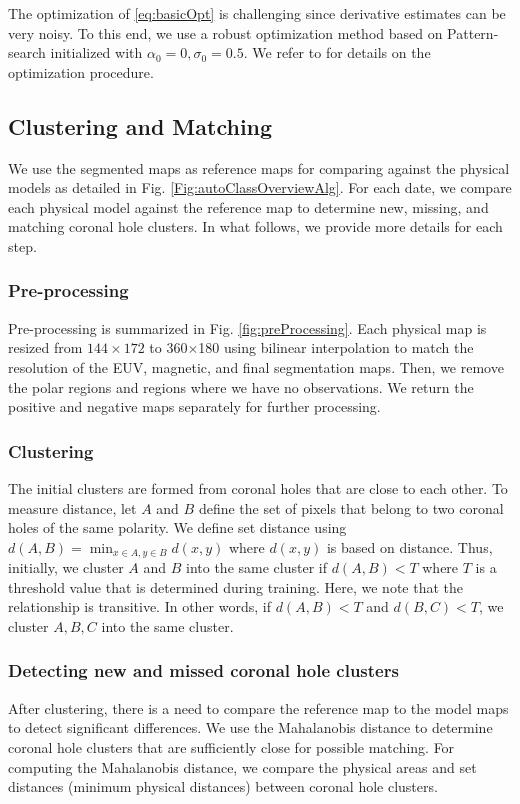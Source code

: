 \documentclass[journal]{IEEEtran}
\begin{document}
The optimization of \eqref{eq:basicOpt} is challenging since
derivative estimates can be very noisy.
To this end, we use a robust optimization method
based on Pattern-search initialized with $\alpha_0=0, \sigma_0=0.5$.
We refer to \cite{optbook} for details on the optimization procedure.       
\color{black}



\subsection{Clustering and Matching}\label{sec:ClusteringAndMatching}
We use the segmented maps as reference maps for comparing
   against the physical models as detailed in Fig. \ref{Fig:autoClassOverviewAlg}.
For each date, we compare each physical model against the reference
   map to determine new, missing, and matching coronal hole clusters. 
In what follows, we provide more details for each step. 
\subsubsection{Pre-processing}\label{sec:ch4preprocessing}
Pre-processing is summarized in Fig. \ref{fig:preProcessing}.
\color{blue} 
Each physical map is resized from $144\times 172$ to 360$\times$180 using bilinear interpolation
 to match the resolution of the EUV, magnetic, and final segmentation maps.
\color{black} 
Then, we remove the polar regions and regions where we have no observations.
We return the positive and negative maps separately for further processing.

\subsubsection{Clustering}\label{sec:ch4clustering_close}
The initial clusters are formed from coronal holes that are close to each other.
To measure distance, let $A$ and $B$ define the set of pixels that belong to 
   two coronal holes of the same polarity.
We define set distance using $d(A, B)=\min_{x\in A, y\in B} d(x, y)$ where
   $d(x,y)$ is based on distance.
Thus, initially, we cluster $A$ and $B$ into the same cluster
   if $d(A, B)<T$ where $T$ is a threshold value that is determined during training.
Here, we note that the relationship is transitive.
In other words, if $d(A, B)<T$ and $d(B, C)<T$, we cluster 
   $A, B, C$ into the same cluster.   

\subsubsection{Detecting new and missed coronal hole clusters}\label{sec:ch4detecting_genrem}
After clustering, there is a need to compare the reference map to the model maps to detect significant differences. We use the Mahalanobis distance to determine coronal hole clusters that are sufficiently close for possible matching.
For computing the Mahalanobis distance, we compare  the physical areas and set distances (minimum physical distances) between coronal hole clusters.  
\end{document}
